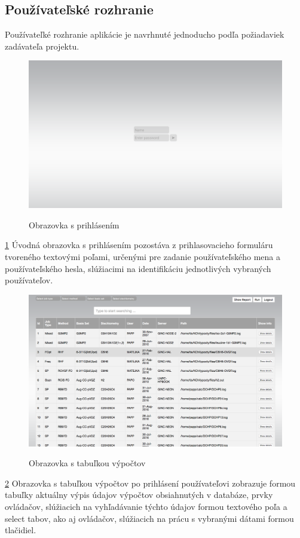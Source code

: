 \documentclass[12pt,a4paper]{article}
\begin{document}
\subsection{Používateľské rozhranie}
Používateľké rozhranie aplikácie je navrhnuté jednoducho podľa požiadaviek zadávateľa projektu.
\begin{figure}[H]
	\caption{Obrazovka s prihlásením}
	\includegraphics[width=\textwidth]{login}
	\label{fig:ui1}
\end{figure}
\ref{fig:ui1}
Úvodná obrazovka s prihlásením pozostáva z prihlasovacieho formuláru tvoreného textovými poľami, určenými pre zadanie používateľského mena a používateľského hesla, slúžiacimi na identifikáciu jednotlivých vybraných používateľov.
\begin{figure}[H]
	\caption{Obrazovka s tabuľkou výpočtov}
	\includegraphics[width=\textwidth]{table}
	\label{fig:ui2}
\end{figure}
\ref{fig:ui2}
Obrazovka s tabuľkou výpočtov po prihlásení používateľovi zobrazuje formou tabuľky aktuálny výpis údajov výpočtov obsiahnutých v databáze, prvky ovládačov, slúžiacich na vyhľadávanie týchto údajov formou textového poľa a select tabov, ako aj ovládačov, slúžiacich na prácu s vybranými dátami formou tlačidiel.
\end{document}
